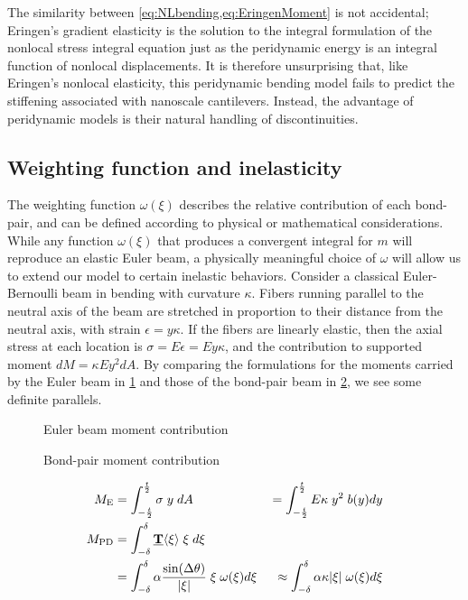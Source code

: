 The similarity between \cref{eq:NLbending,eq:EringenMoment} is not accidental; Eringen's gradient elasticity is the solution to the integral formulation of the nonlocal stress integral equation just as the peridynamic energy is an integral function of nonlocal displacements.
It is therefore unsurprising that, like Eringen's nonlocal elasticity\cite{Challamel2008small}, this peridynamic bending model fails to predict the stiffening associated with nanoscale cantilevers.
Instead, the advantage of peridynamic models is their natural handling of discontinuities.

\subsection{Weighting function and inelasticity}
\label{sec:WeightFunction}
The weighting function \(\omega(\xi)\) describes the relative contribution of each bond-pair, and can be defined according to physical or mathematical considerations. 
While any function $\omega(\xi)$ that produces a convergent integral for $m$ will reproduce an elastic Euler beam, a physically meaningful choice of $\omega$ will allow us to extend our model to certain inelastic behaviors.
Consider a classical Euler-Bernoulli beam in bending with curvature \(\kappa\). 
Fibers running parallel to the neutral axis of the beam are stretched in proportion to their distance from the neutral axis, with strain \(\epsilon = y\kappa\). 
If the fibers are linearly elastic, then the axial stress at each location is \(\sigma = E\epsilon = Ey\kappa\), and the contribution to supported moment \(dM = \kappa E y^2 dA\). 
By comparing the formulations for the moments carried by the Euler beam in \cref{fig:EulerBending} and those of the bond-pair beam in \cref{fig:BPBending}, we see some definite parallels.
%
\begin{figure}[htbp]
\centering
{}
\caption{Euler beam moment contribution}
\label{fig:EulerBending}
\end{figure}
%
%
\begin{figure}[htbp]
  \vspace{5mm}
\centering
{}
\caption{Bond-pair moment contribution}
\label{fig:BPBending}
\end{figure}
%
\begin{align}
M_\text{E}&=\int_{-\frac{t}{2}}^{\frac{t}{2}} \sigma \; y \; dA &= \int_{-\frac{t}{2}}^{\frac{t}{2}} E \kappa \; y^2 \; b(y) dy\notag \\
%
M_\text{PD}&=\int_{-\delta}^{\delta} \vstate{T}{}{\xi}\; \xi \; d\xi &\notag \\
&= \int_{-\delta}^{\delta} \alpha \frac{\sin(\Delta\theta)}{|\xi|} \; \xi \; \omega(\xi) d\xi\: &\approx \int_{-\delta}^{\delta} \alpha \kappa |\xi| \; \omega(\xi) d\xi\notag
\end{align}
